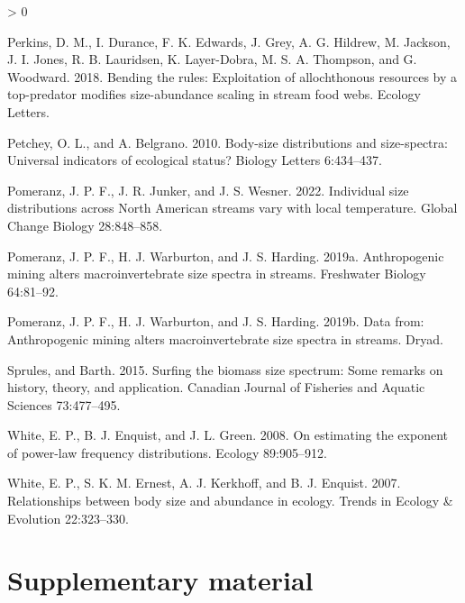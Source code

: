 \documentclass[
]{article}
\newlength{\cslhangindent}
\newenvironment{CSLReferences}[2] %
 {%
  \setlength{\parindent}{0pt}
  \ifodd #1 \everypar{\setlength{\hangindent}{\cslhangindent}}\ignorespaces\fi
  \ifnum #2 > 0
  \setlength{\parskip}{#2\baselineskip}
  \fi
 }%
 {}
\begin{document}
\begin{CSLReferences}{1}{0}
\leavevmode\hypertarget{ref-Perkins2018}{}%
Perkins, D. M., I. Durance, F. K. Edwards, J. Grey, A. G. Hildrew, M.
Jackson, J. I. Jones, R. B. Lauridsen, K. Layer-Dobra, M. S. A.
Thompson, and G. Woodward. 2018. Bending the rules: Exploitation of
allochthonous resources by a top-predator modifies size-abundance
scaling in stream food webs. Ecology Letters.

\leavevmode\hypertarget{ref-Petchey2010}{}%
Petchey, O. L., and A. Belgrano. 2010. Body-size distributions and
size-spectra: Universal indicators of ecological status? Biology Letters
6:434--437.

\leavevmode\hypertarget{ref-Pomeranz2022}{}%
Pomeranz, J. P. F., J. R. Junker, and J. S. Wesner. 2022. Individual
size distributions across {North American} streams vary with local
temperature. Global Change Biology 28:848--858.

\leavevmode\hypertarget{ref-pomeranzAnthropogenicMiningAlters2019}{}%
Pomeranz, J. P. F., H. J. Warburton, and J. S. Harding. 2019a.
Anthropogenic mining alters macroinvertebrate size spectra in streams.
Freshwater Biology 64:81--92.

\leavevmode\hypertarget{ref-Pomeranz2019}{}%
Pomeranz, J. P. F., H. J. Warburton, and J. S. Harding. 2019b. Data
from: {Anthropogenic} mining alters macroinvertebrate size spectra in
streams. {Dryad}.

\leavevmode\hypertarget{ref-sprulesSurfingBiomassSize2015}{}%
Sprules, and Barth. 2015. Surfing the biomass size spectrum: Some
remarks on history, theory, and application. Canadian Journal of
Fisheries and Aquatic Sciences 73:477--495.

\leavevmode\hypertarget{ref-white2008}{}%
White, E. P., B. J. Enquist, and J. L. Green. 2008. On estimating the
exponent of power-law frequency distributions. Ecology 89:905--912.

\leavevmode\hypertarget{ref-White2007}{}%
White, E. P., S. K. M. Ernest, A. J. Kerkhoff, and B. J. Enquist. 2007.
Relationships between body size and abundance in ecology. Trends in
Ecology \& Evolution 22:323--330.

\end{CSLReferences}

\newpage

\hypertarget{supplementary-material}{%
\section*{Supplementary material}\label{supplementary-material}}
\end{document}
